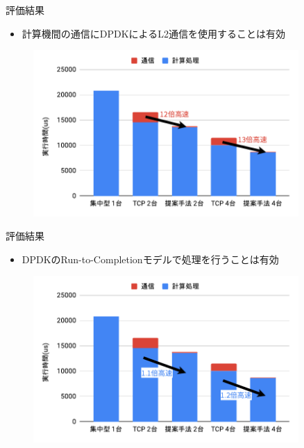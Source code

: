 \documentclass[12pt, unicode]{beamer}
\begin{document}
\begin{frame}{評価結果}
  \begin{itemize}
    \item 計算機間の通信にDPDKによるL2通信を使用することは有効
  \end{itemize}

  \begin{figure}[h]
    \centering
    \includegraphics[width=0.9\textwidth]{pictures/EvaluationResult3.pdf}
  \end{figure}
\end{frame}

\begin{frame}{評価結果}
  \begin{itemize}
    \item DPDKのRun-to-Completionモデルで処理を行うことは有効
  \end{itemize}

  \begin{figure}[h]
    \centering
    \includegraphics[width=0.9\textwidth]{pictures/EvaluationResult4.pdf}
  \end{figure}
\end{frame}
\end{document}
